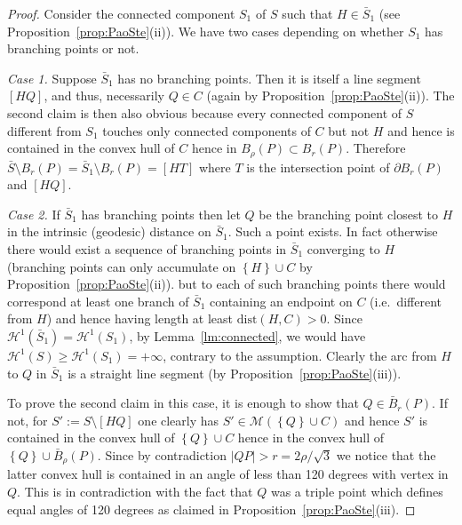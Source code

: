 \documentclass{amsart}
\renewcommand{\H}{\mathcal H}
\newcommand{\abs}[1]{\left\vert #1 \right\vert}
\newcommand{\ENCLOSE}[1]{\left\{#1\right\}}
\newcommand{\M}{\mathcal{M}}
\renewcommand{\H}{\mathcal{H}}
\newcommand{\dist}{\mathrm{dist}}
\theoremstyle{definition}
\theoremstyle{remark}
\begin{document}
\begin{proof}
  Consider the connected component $S_1$ of $S$ such that $H\in \bar S_1$
  (see Proposition~\ref{prop:PaoSte}(ii)).
  We have two cases depending on whether $S_1$ has branching points or not.
  
  \emph{Case 1.} Suppose $\bar S_1$ has no branching points. 
  Then it is itself a line 
  segment $[HQ]$, and thus, necessarily $Q\in C$ 
  (again by Proposition~\ref{prop:PaoSte}(ii)).
  The second claim is then also obvious because every connected component 
  of $S$ different from $S_1$ touches only connected components of $C$ 
  but not $H$
  and hence is contained in the convex hull of $C$ hence in $B_\rho(P)\subset B_r(P)$.
  Therefore $\bar S\setminus B_r(P) = \bar S_1\setminus B_r(P) = [HT]$
  where $T$ is the intersection point of $\partial B_r(P)$ and $[HQ]$.
  
  \emph{Case 2.} If $\bar S_1$ has branching points
  then let $Q$ be the branching point closest to $H$ 
  in the intrinsic (geodesic) distance on $\bar S_1$.
  Such a point exists. In fact otherwise there would exist a sequence of 
  branching points in $\bar S_1$ converging to $H$
  (branching points can only accumulate on $\ENCLOSE{H}\cup C$ 
  by Proposition~\ref{prop:PaoSte}(ii)).
  but to each of such branching points there would correspond at least 
  one branch of $\bar S_1$ containing an endpoint on $C$ 
  (i.e.\ different from $H$) and hence having length at least $\dist(H,C)>0$.
  Since $\H^1(\bar S_1)=\H^1(S_1)$, by Lemma~\ref{lm:connected}, 
  we would have $\H^1(S)\ge \H^1(S_1)= +\infty$, contrary to the assumption.
  Clearly the arc from $H$ to $Q$ in $\bar S_1$ is a straight line segment 
  (by Proposition~\ref{prop:PaoSte}(iii)).
  
  To prove the second claim in this case, 
  it is enough to show that $Q\in \bar B_r(P)$.
  If not, for $S':=S\setminus [HQ]$ one clearly has $S'\in \M(\ENCLOSE{Q} \cup C)$
  and hence $S'$ is contained in the convex hull of $\ENCLOSE{Q}\cup C$
  hence in the convex hull of $\ENCLOSE{Q}\cup \bar B_\rho(P)$.
  Since by contradiction $\abs{QP}> r = 2\rho/\sqrt 3$ 
  we notice that the latter convex 
  hull is contained in an angle of less than 120 degrees with vertex in $Q$.
  This is in contradiction with the fact that $Q$ was a triple point 
  which defines equal angles of 120 degrees as claimed in 
  Proposition~\ref{prop:PaoSte}(iii).
  \end{proof}
\end{document}
